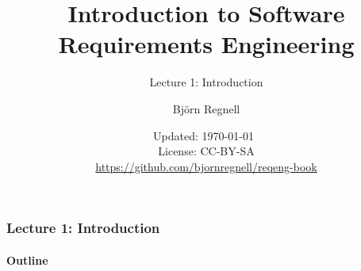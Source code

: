 \documentclass{reqenglecture}
\title{Introduction to Software Requirements Engineering}
\subtitle{Lecture 1: Introduction}
\author{Björn Regnell}
\date{\vspace{1em}\footnotesize Updated: \today~
\\ License: CC-BY-SA 
\\ \url{https://github.com/bjornregnell/reqeng-book} 
}
\begin{document}
\maketitle

\begin{frame}
\frametitle{Lecture 1: Introduction}
\framesubtitle{Outline}
\tableofcontents
\end{frame}















\end{document}
